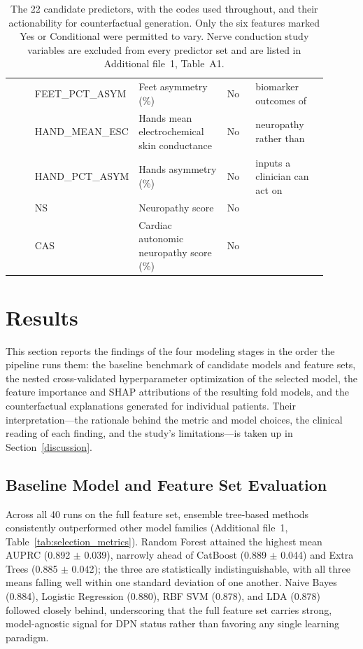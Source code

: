 \documentclass[pdflatex,sn-mathphys-num]{sn-jnl}%
\theoremstyle{thmstyleone}%
\theoremstyle{thmstyletwo}%
\theoremstyle{thmstylethree}%
\begin{document}
\begin{table}[tbp]
\begin{tabular}{@{}p{0.10\linewidth} p{0.15\linewidth} p{0.30\linewidth} p{0.10\linewidth} p{0.25\linewidth}@{}}
                & FEET\_PCT\_ASYM & Feet asymmetry (\%) & No & biomarker outcomes of \\
                & HAND\_MEAN\_ESC & Hands mean electrochemical skin conductance & No & neuropathy rather than \\
                & HAND\_PCT\_ASYM & Hands asymmetry (\%) & No & inputs a clinician can act on \\
                & NS & Neuropathy score & No & \\
                & CAS & Cardiac autonomic neuropathy score (\%) & No & \\
        \bottomrule
    \end{tabular}
    \caption{The 22 candidate predictors, with the codes used throughout, and their actionability
    for counterfactual generation. Only the six features marked Yes or Conditional were permitted to
    vary. Nerve conduction study variables are excluded from every predictor set and are listed in
    Additional file~1, Table~A1.}
    \label{tab:cf_features}
\end{table}


\section{Results}\label{results}

This section reports the findings of the four modeling stages in the order the pipeline runs them: the baseline benchmark of candidate models and feature sets, the nested cross-validated hyperparameter optimization of the selected model, the feature importance and SHAP attributions of the resulting fold models, and the counterfactual explanations generated for individual patients. Their interpretation---the rationale behind the metric and model choices, the clinical reading of each finding, and the study's limitations---is taken up in Section~\ref{discussion}.

\subsection{Baseline Model and Feature Set Evaluation}
\label{sec:results-selection}

Across all 40 runs on the full feature set, ensemble tree-based methods consistently outperformed other model families (Additional file~1, Table~\ref{tab:selection_metrics}). Random Forest attained the highest mean AUPRC (0.892 $\pm$ 0.039), narrowly ahead of CatBoost (0.889 $\pm$ 0.044) and Extra Trees (0.885 $\pm$ 0.042); the three are statistically indistinguishable, with all three means falling well within one standard deviation of one another. Naive Bayes (0.884), Logistic Regression (0.880), RBF SVM (0.878), and LDA (0.878) followed closely behind, underscoring that the full feature set carries strong, model-agnostic signal for DPN status rather than favoring any single learning paradigm.
\end{document}
